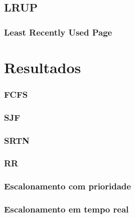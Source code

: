 \documentclass{beamer}
\begin{document}

\subsection{LRUP}
\begin{frame}
\frametitle{Least Recently Used Page}


\justifying
\end{frame}
\section{Resultados} 

\begin{frame}
\frametitle{FCFS} 
\justifying
\end{frame}

\begin{frame}
\frametitle{SJF} 
\justifying
\end{frame}

\begin{frame}
\frametitle{SRTN} 
\justifying
\end{frame}

\begin{frame}
\frametitle{RR} 
\justifying
\end{frame}

\begin{frame}
\frametitle{Escalonamento com prioridade} 
\justifying
\end{frame}

\begin{frame}
\frametitle{Escalonamento em tempo real} 
\justifying
\end{frame}
\end{document}
